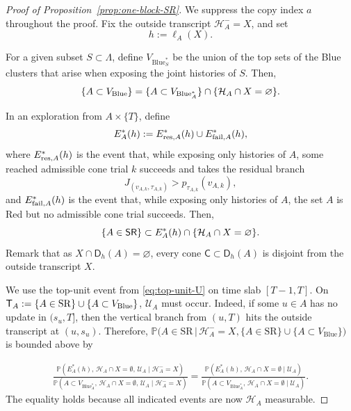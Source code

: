 \documentclass[letterpaper,11pt,reqno]{amsart}
\theoremstyle{definition}
\newcommand{\eset}{\varnothing}
\newcommand{\SR}{{\sf SR}}
\begin{document}
\begin{proof}[Proof of Proposition~\ref{prop:one-block-SR}]


We suppress the copy index \(a\) throughout the proof.
Fix the outside transcript \(\mathcal{H}_A^-=X\), and set
\[
        h:=\ell_A(X).
\]


For a given subset $S\subset \Lambda$, define $V_{\mathrm{Blue}_S^*}$ be the union of the top sets of the Blue clusters that arise when
exposing the joint histories of $S$. Then,
\[
\{A\subset V_{\rm{Blue}}\}=\{A\subset V_{\mathrm{Blue}_A^*}\}\cap \{\mathcal{H}_A\cap X=\eset\}.
\]

In an exploration from \(A\times\{T\}\), define
\[
        E_A^*(h):=E_{{\rm res},A}^*(h)\cup E_{{\rm fail},A}^*(h),
\]
where \(E_{{\rm res},A}^*(h)\) is the event that, while exposing only histories
of \(A\), some reached admissible cone trial \(k\) succeeds and takes the
residual branch
\[
        J_{(v_{A,k},\tau_{A,k})}>p_{\tau_{A,k}}(v_{A,k}),
\]
and \(E_{{\rm fail},A}^*(h)\) is the event that, while exposing only histories
of \(A\), the set \(A\) is Red but no admissible cone trial succeeds.
Then,
\[
\{A\in\SR\}\subset E_A^*(h)\cap\{\mathcal H_A\cap X=\eset\}.
\]
Remark that as $X\cap \mathsf D_h(A)=\varnothing$, every cone \(\mathsf C\subset\mathsf D_h(A)\) is disjoint from the outside
transcript \(X\). 


We use the top-unit event from \eqref{eq:top-unit-U} on time slab $[T-1,T]$.
On $\mathsf T_A:=\{A\in{\rm SR}\}\cup \{A\subset V_{\rm Blue}\}$, \(\mathcal U_A\) must occur.
Indeed, if some
\(u\in A\) has no update in \((s_u,T]\), then the vertical branch
from \((u,T)\) hits the outside transcript at \((u,s_u)\). Therefore,
$\mathbb{P}\big(A\in\mathrm{SR} \,\big\vert\, \mathcal{H}_A^-= X,\{A\in\mathrm{SR}\}\cup\{A\subset V_{\mathrm{Blue}}\}\big)$ is bounded above by



\begin{align*}
\frac{
\mathbb{P}\left(
E_A^*(h),\,
\mathcal{H}_{A}\cap  X=\emptyset,\,
\mathcal{U}_A
\mid \mathcal{H}_{A}^{-}= X
\right)
}{
\mathbb{P}\left(
A\subset V_{\mathrm{Blue}_{A}^{*}},\,
\mathcal{H}_{A}\cap X=\emptyset,\,
\mathcal{U}_A
\mid \mathcal{H}_{A}^{-}= X
\right)
}
=
\frac{
\mathbb{P}\left(
E_A^*(h),\,
\mathcal{H}_{A}\cap  X=\emptyset
\mid \mathcal{U}_A
\right)
}{
\mathbb{P}\left(
A\subset V_{\mathrm{Blue}_{A}^{*}},\,
\mathcal{H}_{A}\cap X=\emptyset
\mid \mathcal{U}_A
\right)
}
.
\end{align*}
The equality holds because all indicated events are now $\mathcal{H}_A$ measurable.





\end{proof}
\end{document}
